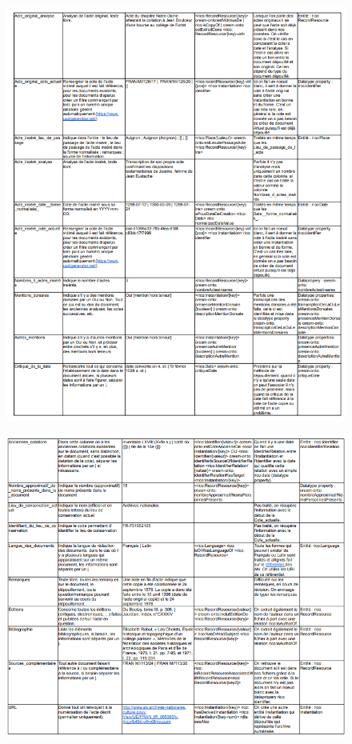 \begin{figure}[!h]
    \centering
    \includegraphics[width=1\linewidth]{annexes/mapping3.png}
\end{figure}
\begin{figure}[!h]
    \centering
    \includegraphics[width=1\linewidth]{annexes/mapping4.png}
\end{figure}